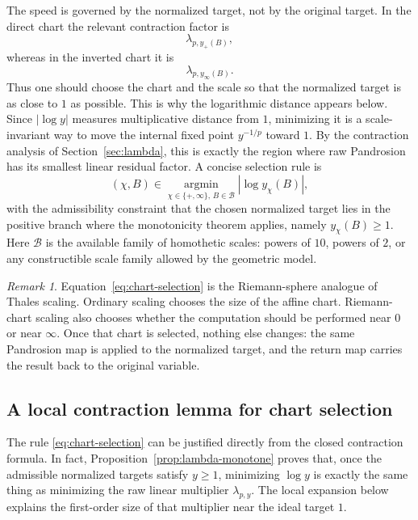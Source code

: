 \documentclass[10pt,a4paper]{article}
\theoremstyle{plain}
\theoremstyle{definition}
\theoremstyle{remark}
\newtheorem{remark}[theorem]{Remark}
\begin{document}
The speed is governed by the normalized target, not by the original target.  In
the direct chart the relevant contraction factor is
\[
  \lambda_{p,y_+(B)},
\]
whereas in the inverted chart it is
\[
  \lambda_{p,y_\infty(B)}.
\]
Thus one should choose the chart and the scale so that the normalized target is
as close to $1$ as possible.  This is why the logarithmic distance appears
below.  Since $|\log y|$ measures multiplicative distance from $1$, minimizing
it is a scale-invariant way to move the internal fixed point
$y^{-1/p}$ toward $1$.  By the contraction analysis of
Section~\ref{sec:lambda}, this is exactly the region where raw Pandrosion has
its smallest linear residual factor.  A concise selection rule is
\begin{equation}
  (\chi,B)\in
  \operatorname*{argmin}_{\chi\in\{+,\infty\},\,B\in\mathcal B}
  \left|\log y_\chi(B)\right|,
  \label{eq:chart-selection}
\end{equation}
with the admissibility constraint that the chosen normalized target lies in the
positive branch where the monotonicity theorem applies, namely $y_\chi(B)\ge 1$.
Here $\mathcal B$ is
the available family of homothetic scales: powers of $10$, powers of $2$, or
any constructible scale family allowed by the geometric model.

\begin{remark}
Equation~\eqref{eq:chart-selection} is the Riemann-sphere analogue of Thales
scaling.  Ordinary scaling chooses the size of the affine chart.  Riemann-chart
scaling also chooses whether the computation should be performed near $0$ or
near $\infty$.  Once that chart is selected, nothing else changes: the same
Pandrosion map is applied to the normalized target, and the return map carries
the result back to the original variable.
\end{remark}


\subsection{A local contraction lemma for chart selection}
\label{subsec:chart-contraction-lemma}

The rule \eqref{eq:chart-selection} can be justified directly from the closed
contraction formula.  In fact, Proposition~\ref{prop:lambda-monotone} proves
that, once the admissible normalized targets satisfy $y\ge1$, minimizing
$\log y$ is exactly the same thing as minimizing the raw linear multiplier
$\lambda_{p,y}$.  The local expansion below explains the first-order size of
that multiplier near the ideal target $1$.
\end{document}
